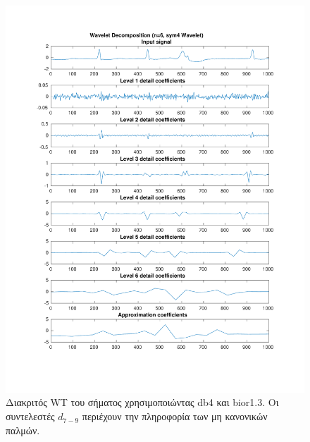 \documentclass[11pt,a4paper]{article}
\begin{document}
\begin{figure}[H]
\begin{minipage}{0.46\textwidth}
	\includegraphics[width=\textwidth]{fig/221l1_dwt2.pdf}
\end{minipage}
\vfill
\caption{Διακριτός WT του σήματος χρησιμοποιώντας db4 και bior1.3. Οι συντελεστές $d_{7-9}$ περιέχουν την πληροφορία των μη κανονικών παλμών.}
\label{fig:221l1_dwt}
\end{figure}
\end{document}
